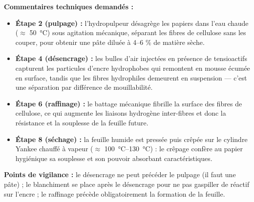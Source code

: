 \documentclass[11pt]{article}
\begin{document}
\begin{corrige}
\textbf{Commentaires techniques demandés :}
\begin{itemize}
    \item \textbf{Étape 2 (pulpage) :} l'hydropulpeur désagrège les papiers dans l'eau chaude ($\approx$ \SI{50}{\celsius}) sous agitation mécanique, séparant les fibres de cellulose sans les couper, pour obtenir une pâte diluée à 4--6 \% de matière sèche.
    \item \textbf{Étape 4 (désencrage) :} les bulles d'air injectées en présence de tensioactifs capturent les particules d'encre hydrophobes qui remontent en mousse écumée en surface, tandis que les fibres hydrophiles demeurent en suspension — c'est une séparation par différence de mouillabilité.
    \item \textbf{Étape 6 (raffinage) :} le battage mécanique fibrille la surface des fibres de cellulose, ce qui augmente les liaisons hydrogène inter-fibres et donc la résistance et la souplesse de la feuille future.
    \item \textbf{Étape 8 (séchage) :} la feuille humide est pressée puis crêpée sur le cylindre Yankee chauffé à vapeur ($\approx$ \SI{100}{\celsius}--\SI{130}{\celsius}) : le crêpage confère au papier hygiénique sa souplesse et son pouvoir absorbant caractéristiques.
\end{itemize}

\textbf{Points de vigilance :} le désencrage ne peut précéder le pulpage (il faut une pâte) ; le blanchiment se place après le désencrage pour ne pas gaspiller de réactif sur l'encre ; le raffinage précède obligatoirement la formation de la feuille.
\end{corrige}
\end{document}
